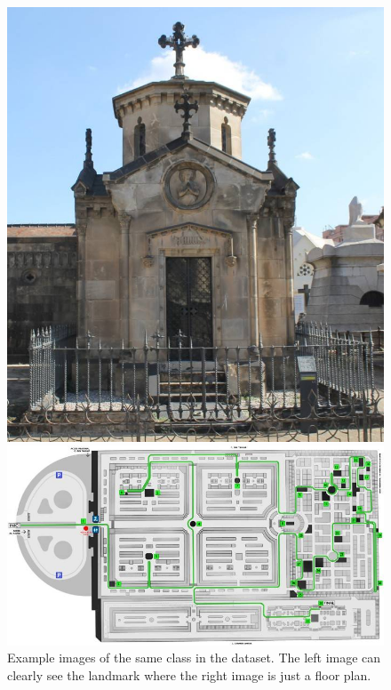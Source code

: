 \documentclass[10pt,twocolumn,letterpaper]{article}
\begin{document}
\begin{figure}[!htb]
    \centering
    \begin{minipage}[t]{0.23\textwidth}
        \includegraphics[width=\textwidth]{img/4440bfd817bfb6c8.jpg}
    \end{minipage}
    \begin{minipage}[t]{0.23\textwidth}
        \includegraphics[width=\textwidth]{img/1115e27655e0f398.jpg}
    \end{minipage}


    \caption{Example images of the same class in the dataset. The left image can clearly see the landmark where the right image is just a floor plan.}
    \label{fig:landmark_example}
\end{figure}
\end{document}
